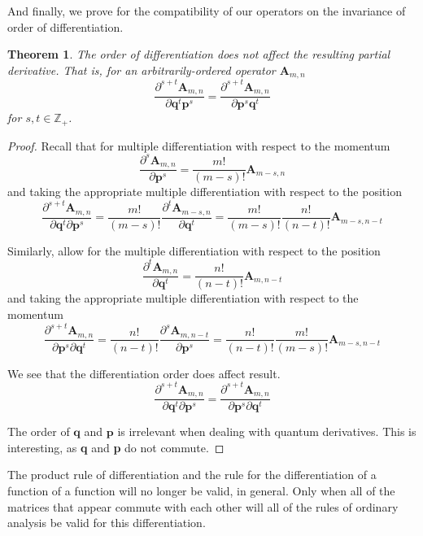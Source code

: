 \documentclass[a4paper]{article}
\newtheorem{theorem}{Theorem}[section]
\theoremstyle{definition}
\begin{document}
And finally, we prove for the compatibility of our operators on the invariance of order of differentiation.
\begin{theorem}
	The order of differentiation does not affect the resulting partial derivative. That is, for an arbitrarily-ordered operator $\textbf{A}_{m,n}$
	\begin{equation}
		\frac{\partial^{s+t}\textbf{A}_{m,n}}{\partial\textbf{q}^t\textbf{p}^s}=\frac{\partial^{s+t}\textbf{A}_{m,n}}{\partial\textbf{p}^s\textbf{q}^t}
	\end{equation}
	for $s,t\in\mathbb{Z}_+$.
\end{theorem}
\begin{proof}
	Recall that for multiple differentiation with respect to the momentum
	\begin{equation}
		\frac{\partial^s\textbf{A}_{m,n}}{\partial\textbf{p}^s}=\frac{m!}{(m-s)!}\textbf{A}_{m-s,n}
	\end{equation}
	and taking the appropriate multiple differentiation with respect to the position
	\begin{equation}
		\frac{\partial^{s+t}\textbf{A}_{m,n}}{\partial\textbf{q}^t\partial\textbf{p}^s}=\frac{m!}{(m-s)!}\frac{\partial^t\textbf{A}_{m-s,n}}{\partial\textbf{q}^t}=\frac{m!}{(m-s)!}\frac{n!}{(n-t)!}\textbf{A}_{m-s,n-t}
	\end{equation}
	
	Similarly, allow for the multiple differentiation with respect to the position
	\begin{equation}
		\frac{\partial^t\textbf{A}_{m,n}}{\partial\textbf{q}^t}=\frac{n!}{(n-t)!}\textbf{A}_{m,n-t}
	\end{equation}
	and taking the appropriate multiple differentiation with respect to the momentum
	\begin{equation}
		\frac{\partial^{s+t}\textbf{A}_{m,n}}{\partial\textbf{p}^s\partial\textbf{q}^t}=\frac{n!}{(n-t)!}\frac{\partial^s\textbf{A}_{m,n-t}}{\partial\textbf{p}^s}=\frac{n!}{(n-t)!}\frac{m!}{(m-s)!}\textbf{A}_{m-s,n-t}
	\end{equation}
	
	We see that the differentiation order does affect result.
	\begin{equation}
		\frac{\partial^{s+t}\textbf{A}_{m,n}}{\partial\textbf{q}^t\partial\textbf{p}^s}=\frac{\partial^{s+t}\textbf{A}_{m,n}}{\partial\textbf{p}^s\partial\textbf{q}^t}
	\end{equation}
	
	The order of $\textbf{q}$ and $\textbf{p}$ is irrelevant when dealing with quantum derivatives. This is interesting, as \textbf{q} and \textbf{p} do not commute.
\end{proof}
The product rule of differentiation and the rule for the differentiation of a function of a function will no longer be valid, in general. Only when all of the matrices that appear commute with each other will all of the rules of ordinary analysis be valid for this differentiation.
\end{document}
